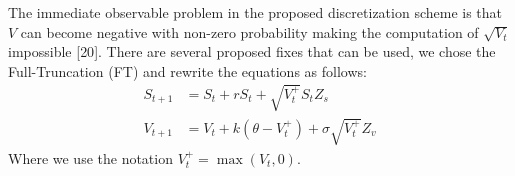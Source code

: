 \documentclass[12pt,twoside]{reedthesis}
\theoremstyle{definition}
\theoremstyle{definition}
\theoremstyle{remark}
\begin{document}
  The immediate observable problem in the proposed discretization scheme
  is that \(V\) can become negative with non-zero probability making the
  computation of \(\sqrt{V_t}\) impossible {[}20{]}. There are several
  proposed fixes that can be used, we chose the Full-Truncation (FT) and
  rewrite the equations as follows:
  \begin{align}
  S_{t+1} &= S_t + rS_t + \sqrt{V_{t}^{+}} S_t Z_s \\
  V_{t+1} &= V_t + k (\theta - V_{t}^{+}) + \sigma \sqrt{V_{t}^{+}} Z_v
  \end{align}
  \noindent
  Where we use the notation \(V_{t}^{+} = \max(V_{t}, 0)\).
  \begin{Shaded}
  \begin{Highlighting}[]
  \StringTok{ } \NormalTok{, }
                           \NormalTok{, }  \NormalTok{)\{}
  
      \NormalTok{(}\NormalTok{)}
  
      \NormalTok{(}\StringTok{ }\OperatorTok{-}\OperatorTok{/}\NormalTok{\}}
  
  \StringTok{ }
  \StringTok{ }
  \StringTok{ }
  
       
  \StringTok{ }
  \StringTok{ }
  \StringTok{ }\OperatorTok{*}\StringTok{ }\OperatorTok{+}\StringTok{ }\NormalTok{(}\NormalTok{(} \OperatorTok{-}\StringTok{ }\OperatorTok{^}\NormalTok{)) }\OperatorTok{*}\StringTok{ }
  
  
  \StringTok{ }
  \NormalTok{        aux[v }\OperatorTok{<}\StringTok{ }\NormalTok{] <-}\StringTok{ }
  \StringTok{ }
  \StringTok{ }\OperatorTok{*}\StringTok{ }\NormalTok{(} \OperatorTok{+}\StringTok{ }\OperatorTok{*}\StringTok{ }\OperatorTok{+}\StringTok{ }\OperatorTok{*}\StringTok{ }\OperatorTok{*}\StringTok{ }
  \NormalTok{        S[S }\OperatorTok{<=}\StringTok{ }\NormalTok{] =}\StringTok{ }
  

\end{Highlighting}
\end{Shaded}
\end{document}
